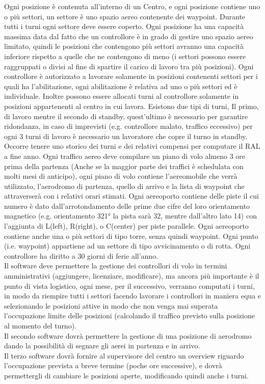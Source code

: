 Ogni posizione è contenuta all'interno di un Centro, e ogni posizione contiene uno o più settori, un settore è uno spazio aereo contenente dei waypoint. Durante tutti i turni ogni settore deve essere coperto. 
Ogni posizione ha una capacità massima data dal fatto che un controllore è in grado di gestire uno spazio aereo limitato, quindi le posizioni che contengono più settori avranno una capacità inferiore rispetto a quelle che ne contengono di meno (i settori possono essere raggruppati o divisi al fine di spartire il carico di lavoro tra più posizioni).
Ogni controllore è autorizzato a lavorare solamente in posizioni contenenti settori per i quali ha l’abilitazione, ogni abilitazione è relativa ad uno o più settori ed è individuale. Inoltre possono essere allocati turni al controllore solamente in posizioni appartenenti al centro in cui lavora.
Esistono due tipi di turni, Il primo, di lavoro mentre il secondo di standby, quest'ultimo è necessario per garantire ridondanza, in caso di imprevisti (e.g. controllore malato, traffico eccessivo)
per ogni 3 turni di lavoro è necessario un lavoratore che copre il turno in standby. Occorre tenere uno storico dei turni e dei relativi compensi per computare il RAL a fine anno.
Ogni traffico aereo deve compilare un piano di volo almeno 3 ore prima della partenza (Anche se la maggior parte dei traffici è schedulata con molti mesi di anticipo), ogni piano di volo contiene l'aereomobile che verrà utilizzato, l'aerodromo di partenza, quello di arrivo e la lista di waypoint che attraverserà con i relativi orari stimati. Ogni aereoporto contiene delle piste il cui numero è dato dall'arrotondamento delle prime due cifre del loro orientamento magnetico (e.g. orientamento 321° la pista sarà 32, mentre dall'altro lato 14) con l'aggiunta di L(left), R(right), o C(center) per piste parallele. Ogni aereoporto contiene anche una o più settori di tipo torre, senza quindi waypoint. 
Ogni punto (i.e. waypoint) appartiene ad un settore di tipo avvicinamento o di rotta.
Ogni controllore ha diritto a 30 giorni di ferie all'anno.\\
Il software deve permettere la gestione dei controllori di volo in termini amministrativi (aggiungere, licenziare, modificare), 
ma ancora più importante è il punto di vista logistico, ogni mese, per il successivo, verranno computati i turni, in modo da riempire tutti i settori facendo lavorare i controllori in maniera equa e selezionando le posizioni attive in modo che non venga mai superata l'occupazione limite delle posizioni (calcolando il traffico previsto sulla posizione al momento del turno).\\
Il secondo software dovrà permettere la gestione di una posizione di aerodromo dando la possibilità di segnare gli aerei in partenza e in arrivo.\\
Il terzo software dovrà fornire al supervisore del centro un overview riguardo l'occupazione prevista a breve termine (poche ore successive), e dovrà permettergli di cambiare le posizioni aperte, modificando quindi anche i turni.\\
